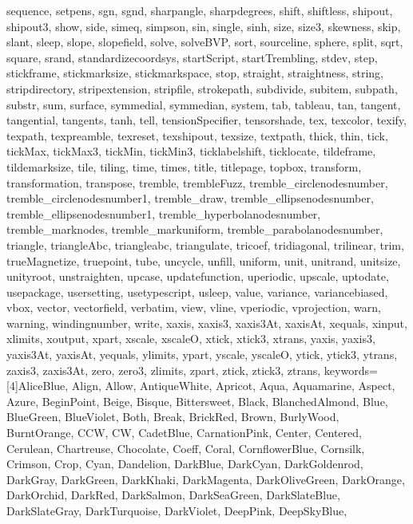 {{  sequence, setpens, sgn, sgnd, sharpangle, sharpdegrees, shift, shiftless,
  shipout, shipout3, show, side, simeq, simpson, sin, single, sinh, size,
  size3, skewness, skip, slant, sleep, slope, slopefield, solve, solveBVP,
  sort, sourceline, sphere, split, sqrt, square, srand, standardizecoordsys,
  startScript, startTrembling, stdev, step, stickframe, stickmarksize,
  stickmarkspace, stop, straight, straightness, string, stripdirectory,
  stripextension, stripfile, strokepath, subdivide, subitem, subpath, substr,
  sum, surface, symmedial, symmedian, system, tab, tableau, tan, tangent,
  tangential, tangents, tanh, tell, tensionSpecifier, tensorshade, tex,
  texcolor, texify, texpath, texpreamble, texreset, texshipout, texsize,
  textpath, thick, thin, tick, tickMax, tickMax3, tickMin, tickMin3,
  ticklabelshift, ticklocate, tildeframe, tildemarksize, tile, tiling, time,
  times, title, titlepage, topbox, transform, transformation, transpose,
  tremble, trembleFuzz, tremble_circlenodesnumber,
  tremble_circlenodesnumber1, tremble_draw, tremble_ellipsenodesnumber,
  tremble_ellipsenodesnumber1, tremble_hyperbolanodesnumber,
  tremble_marknodes, tremble_markuniform, tremble_parabolanodesnumber,
  triangle, triangleAbc, triangleabc, triangulate, tricoef, tridiagonal,
  trilinear, trim, trueMagnetize, truepoint, tube, uncycle, unfill, uniform,
  unit, unitrand, unitsize, unityroot, unstraighten, upcase, updatefunction,
  uperiodic, upscale, uptodate, usepackage, usersetting, usetypescript,
  usleep, value, variance, variancebiased, vbox, vector, vectorfield,
  verbatim, view, vline, vperiodic, vprojection, warn, warning,
  windingnumber, write, xaxis, xaxis3, xaxis3At, xaxisAt, xequals, xinput,
  xlimits, xoutput, xpart, xscale, xscaleO, xtick, xtick3, xtrans, yaxis,
  yaxis3, yaxis3At, yaxisAt, yequals, ylimits, ypart, yscale, yscaleO, ytick,
  ytick3, ytrans, zaxis3, zaxis3At, zero, zero3, zlimits, zpart, ztick,
  ztick3, ztrans},
  keywords=[4]{AliceBlue, Align, Allow, AntiqueWhite, Apricot, Aqua,
  Aquamarine, Aspect, Azure, BeginPoint, Beige, Bisque, Bittersweet, Black,
  BlanchedAlmond, Blue, BlueGreen, BlueViolet, Both, Break, BrickRed, Brown,
  BurlyWood, BurntOrange, CCW, CW, CadetBlue, CarnationPink, Center,
  Centered, Cerulean, Chartreuse, Chocolate, Coeff, Coral, CornflowerBlue,
  Cornsilk, Crimson, Crop, Cyan, Dandelion, DarkBlue, DarkCyan,
  DarkGoldenrod, DarkGray, DarkGreen, DarkKhaki, DarkMagenta, DarkOliveGreen,
  DarkOrange, DarkOrchid, DarkRed, DarkSalmon, DarkSeaGreen, DarkSlateBlue,
  DarkSlateGray, DarkTurquoise, DarkViolet, DeepPink, DeepSkyBlue,
}}
